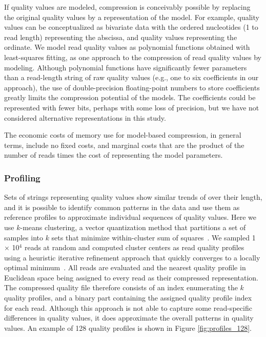 \documentclass{bioinfo}
\begin{document}
\begin{methods}
If quality values are modeled, compression is conceivably possible by
replacing the original quality values by a representation of the
model. For example, quality values can be conceptualized as bivariate
data with the ordered nucleotides (1 to read length) representing the
abscissa, and quality values representing the ordinate. We model read
quality values as polynomial functions obtained with least-squares
fitting, as one approach to the compression of read quality values by
modeling. Although polynomial functions have significantly fewer
parameters than a read-length string of raw quality values (e.g., one
to six coefficients in our approach), the use of double-precision floating-point
numbers to store coefficients greatly limits the compression potential
of the models. The coefficients could be represented with fewer bits,
perhaps with some loss of precision, but we have not considered
alternative representations in this study.

The economic costs of memory use for model-based compression, in
general terms, include no fixed costs, and marginal costs that are the
product of the number of reads times the cost of representing the
model parameters.

\subsubsection{Profiling}

Sets of strings representing quality values show similar trends of
over their length, and it is possible to identify common patterns in
the data and use them as reference profiles to approximate individual
sequences of quality values. Here we use $k$-means clustering, a
vector quantization method that partitions a set of samples into $k$
sets that minimize within-cluster sum of
squares~\citep{macqueen1967some}. We sampled 1 $\times$ 10$^{4}$ reads
at random and computed cluster centers as read quality profiles using
a heuristic iterative refinement approach that quickly converges to a
locally optimal minimum~\citep{hartigan1979algorithm}. All reads are
evaluated and the nearest quality profile in Euclidean space being
assigned to every read as their compressed representation.  The
compressed quality file therefore consists of an index enumerating the
$k$ quality profiles, and a binary part containing the assigned
quality profile index for each read.  Although this approach is not
able to capture some read-specific differences in quality values, it
does approximate the overall patterns in quality values. An example of
128 quality profiles is shown in Figure \ref{fig:profiles_128}.


\end{methods}
\end{document}
